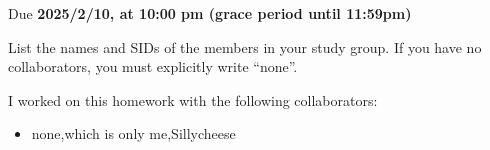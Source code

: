 \documentclass[11pt]{article}
\def\duedate{2025/2/10, at 10:00 pm (grace period until 11:59pm)}
\begin{document}
\maketitle
Due \textbf{\duedate}


List the names and SIDs of the members in your study group.
If you have no collaborators, you must explicitly write ``none''.

\begin{solution} I worked on this homework with the following collaborators:
\begin{itemize}
    \item none,which is only me,Sillycheese
\end{itemize}
\end{solution}

\end{document}
